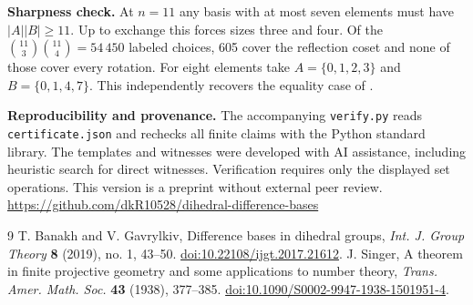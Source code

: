 \documentclass[11pt]{article}
\begin{document}
\textbf{Sharpness check.} At $n=11$ any basis with at most seven elements must have $|A||B|\ge11$. Up to exchange this forces sizes three and four. Of the $\binom{11}{3}\binom{11}{4}=54\,450$ labeled choices, 605 cover the reflection coset and none of those cover every rotation. For eight elements take $A=\{0,1,2,3\}$ and $B=\{0,1,4,7\}$. This independently recovers the equality case of \cite{BG}.

\textbf{Reproducibility and provenance.} The accompanying \texttt{verify.py} reads \texttt{certificate.json} and rechecks all finite claims with the Python standard library. The templates and witnesses were developed with AI assistance, including heuristic search for direct witnesses. Verification requires only the displayed set operations. This version is a preprint without external peer review.\\
\url{https://github.com/dkR10528/dihedral-difference-bases}

\begin{thebibliography}{9}\small
{} T. Banakh and V. Gavrylkiv, Difference bases in dihedral groups, \textit{Int. J. Group Theory} \textbf{8} (2019), no. 1, 43--50. \href{https://doi.org/10.22108/ijgt.2017.21612}{doi:10.22108/ijgt.2017.21612}.
 J. Singer, A theorem in finite projective geometry and some applications to number theory, \textit{Trans. Amer. Math. Soc.} \textbf{43} (1938), 377--385. \href{https://doi.org/10.1090/S0002-9947-1938-1501951-4}{doi:10.1090/S0002-9947-1938-1501951-4}.
\end{thebibliography}
\end{document}
